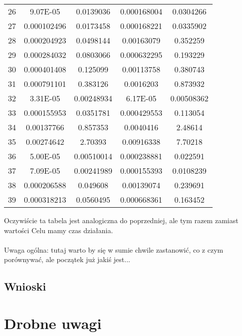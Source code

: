 \documentclass{article}
\begin{document}
\begin{table}[h!]
\begin{tabular}{c||c|c|c|c}
26 & 9.07E-05 & 0.0139036 & 0.000168004 & 0.0304266 \\
27 & 0.000102496 & 0.0173458 & 0.000168221 & 0.0335902 \\
28 & 0.000204923 & 0.0498144 & 0.00163079 & 0.352259 \\
29 & 0.000284032 & 0.0803066 & 0.000632295 & 0.193229 \\
30 & 0.000401408 & 0.125099 & 0.00113758 & 0.380743 \\
31 & 0.000791101 & 0.383126 & 0.0016203 & 0.873932 \\
32 & 3.31E-05 & 0.00248934 & 6.17E-05 & 0.00508362 \\
33 & 0.000155953 & 0.0351781 & 0.000429553 & 0.113054 \\
34 & 0.00137766 & 0.857353 & 0.0040416 & 2.48614 \\
35 & 0.00274642 & 2.70393 & 0.00916338 & 7.70218 \\
36 & 5.00E-05 & 0.00510014 & 0.000238881 & 0.022591 \\
37 & 7.09E-05 & 0.00241989 & 0.000155393 & 0.0108239 \\
38 & 0.000206588 & 0.049608 & 0.00139074 & 0.239691 \\
39 & 0.000318213 & 0.0560495 & 0.000668361 & 0.163452 \\
\end{tabular}
\end{table}

Oczywiście ta tabela jest analogiczna do poprzedniej, ale tym razem zamiast wartości Celu mamy czas działania.\\
\\
Uwaga ogólna: tutaj warto by się w sumie chwile zastanowić, co z czym porównywać, ale początek już jakiś jest... 

\subsection{Wnioski}

\section*{Drobne uwagi}
\end{document}
